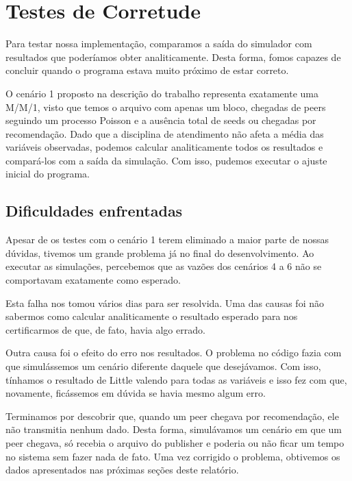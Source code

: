 \documentclass[a4paper,10pt]{article}
\begin{document}
\pagebreak

\section{Testes de Corretude}\label{TestesDeCorretude}

Para testar nossa implementação, comparamos a saída do simulador com resultados que poderíamos obter analiticamente. Desta forma, fomos capazes de concluir quando o programa estava muito próximo de estar correto.

O cenário 1 proposto na descrição do trabalho representa exatamente uma M/M/1, visto que temos o arquivo com apenas um bloco, chegadas de peers seguindo um processo Poisson e a ausência total de seeds ou chegadas por recomendação. Dado que a disciplina de atendimento não afeta a média das variáveis observadas, podemos calcular analiticamente todos os resultados e compará-los com a saída da simulação. Com isso, pudemos executar o ajuste inicial do programa.

\subsection{Dificuldades enfrentadas}

Apesar de os testes com o cenário 1 terem eliminado a maior parte de nossas dúvidas, tivemos um grande problema já no final do desenvolvimento. Ao executar as simulações, percebemos que as vazões dos cenários 4 a 6 não se comportavam exatamente como esperado.

Esta falha nos tomou vários dias para ser resolvida. Uma das causas foi não sabermos como calcular analiticamente o resultado esperado para nos certificarmos de que, de fato, havia algo errado.

Outra causa foi o efeito do erro nos resultados. O problema no código fazia com que simulássemos um cenário diferente daquele que desejávamos. Com isso, tínhamos o resultado de Little valendo para todas as variáveis e isso fez com que, novamente, ficássemos em dúvida se havia mesmo algum erro.

Terminamos por descobrir que, quando um peer chegava por recomendação, ele não transmitia nenhum dado. Desta forma, simulávamos um cenário em que um peer chegava, só recebia o arquivo do publisher e poderia ou não ficar um tempo no sistema sem fazer nada de fato. Uma vez corrigido o problema, obtivemos os dados apresentados nas próximas seções deste relatório.

\pagebreak
\end{document}
